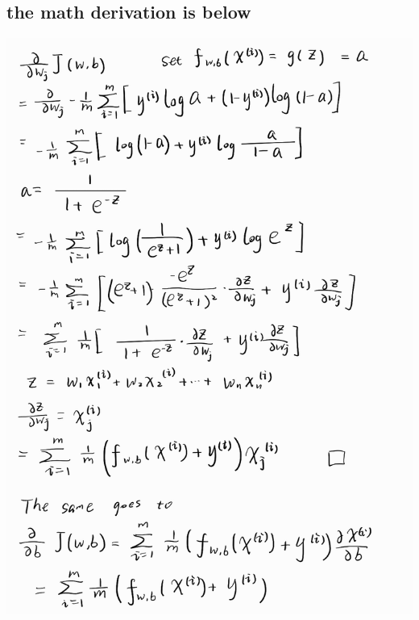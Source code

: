 \subsection*{the math derivation is below}
\newpage
\begin{center}
    \includegraphics[height=\textheight]{images/derivation}
\end{center}


